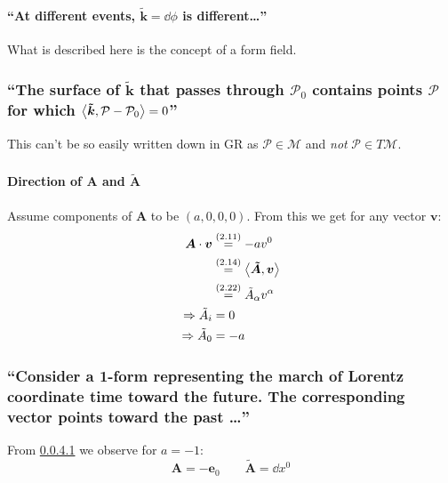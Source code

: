 \subsubsection{ }

\paragraph{\enquote{At different events, $\boldsymbol{\tilde{k}}=\boldsymbol{\dd}{\phi}$ is different\dots}}
What is described here is the concept of a form field.

\subsubsection{\enquote{The surface of $\boldsymbol{\tilde{k}}$ that passes through $\mathcal{P}_0$ contains points $\mathcal{P}$ for which $\left\langle{\boldsymbol{\tilde{k}}},{\mathcal{P}-\mathcal{P}_0}\right\rangle=0$} }\label{sususec:2_5_p56_1}
This can't be so easily written down in GR as $\mathcal{P}\in \mathcal{M}$ and \emph{not} $\mathcal{P}\in T\mathcal{M}$.
 
\subsubsection{ }
\todo

\subsubsection{ }
\paragraph{Direction of $\boldsymbol{A}$ and $ \boldsymbol{\tilde{A}}$} \label{pa:2_5_p58_1}
Assume components of $\boldsymbol{A}$ to be $(a,0,0,0)$. From this we get for any vector $\boldsymbol{v}$:
\begin{align*} 
	\boldsymbol{A}\cdot \boldsymbol{v}&\overset{({2.11})}{=}-a v^0\\
	&\overset{({2.14})}{=}\left\langle{\boldsymbol{\tilde{A}}},{\boldsymbol{v}}\right\rangle\\
	&\overset{({2.22})}{=}\tilde{A}_\alpha v^\alpha\\
	\Rightarrow \tilde{A}_i&=0\\
	\Rightarrow \tilde{A}_0&=-a
\end{align*}

\subsubsection{\enquote{Consider a 1-form representing the march of Lorentz coordinate time toward the future. The corresponding vector points toward the past \dots} }\label{sususec:2_5_p59_1}
From \ref{pa:2_5_p58_1} we observe for $a=-1$:
\[\boldsymbol{A}=- \boldsymbol{e}_0\qquad \boldsymbol{\tilde{A}}=\boldsymbol{\dd}x^0\]

